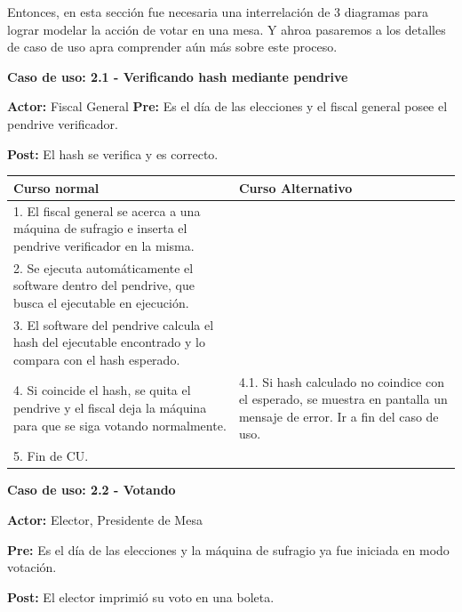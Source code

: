 Entonces, en esta sección fue necesaria una interrelación de 3 diagramas para lograr modelar la acción de votar en una mesa. Y ahroa pasaremos a los detalles de caso de uso apra comprender aún más sobre este proceso.

\newpage

\textbf{Caso de uso: 2.1 - Verificando hash mediante pendrive}

\textbf{Actor:} Fiscal General
\textbf{Pre:} Es el día de las elecciones y el fiscal general posee el pendrive verificador.

\textbf{Post:} El hash se verifica y es correcto.

\begin{table}[h!]
	
 \begin{tabular}{|p{7.5cm} | p{7.5cm}|} 
 \hline
 \textbf{Curso normal} & \textbf{Curso Alternativo} \\
 \hline
	

1. El fiscal general se acerca a una máquina de sufragio e inserta el pendrive verificador en la misma. & \\
 \hline
2. Se ejecuta automáticamente el software dentro del pendrive, que busca el ejecutable en ejecución.& \\


3. El software del pendrive calcula el hash del ejecutable encontrado y lo compara con el hash esperado. & \\
\hline

4. Si coincide el hash, se quita el pendrive y el fiscal deja la máquina para que se siga votando normalmente. &
4.1. Si hash calculado no coindice con el esperado, se muestra en pantalla un mensaje de error. Ir a fin del caso de uso. \\
\hline
5. Fin de CU. & \\
\hline
\end{tabular}
\end{table}

\textbf{Caso de uso: 2.2 - Votando}

\textbf{Actor:} Elector, Presidente de Mesa

\textbf{Pre:} Es el día de las elecciones y la máquina de sufragio ya fue iniciada en modo votación.

\textbf{Post:} El elector imprimió su voto en una boleta.

\newpage

